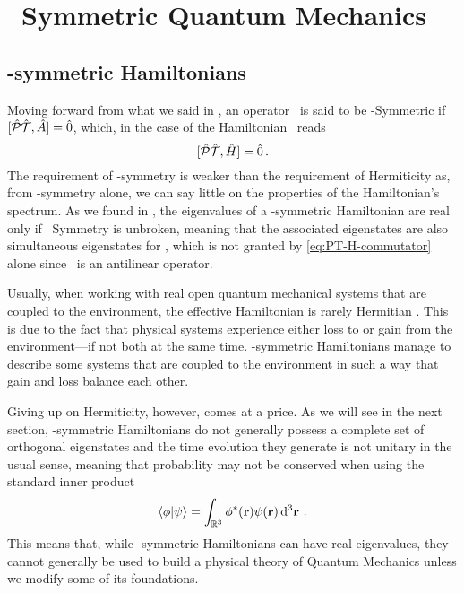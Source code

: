 \chapter{\PT\ Symmetric Quantum Mechanics}\label{ch:pt-symmetric-hamiltonians}
    \section{\PT-symmetric Hamiltonians}
        Moving forward from what we said in , an operator \hA\ is said to be \PT-Symmetric if $\comm*{\hPT}{\hA}\! = \hzero$, which, in the case of the Hamiltonian \hH\ reads
        \begin{equation}
            \label{eq:PT-H-commutator}
            \comm*{\hPT}{\hH}\! = \hzero
            \myperiod
        \end{equation}
        The requirement of \PT-symmetry is weaker than the requirement of Hermiticity as, from \PT-symmetry alone, we can say little on the properties of the Hamiltonian's spectrum. As we found in , the eigenvalues of a \PT-symmetric Hamiltonian are real only if \PT\ Symmetry is unbroken, meaning that the associated eigenstates are also simultaneous eigenstates for \hPT, which is not granted by \eqref{eq:PT-H-commutator} alone since \hPT\ is an antilinear operator.

        Usually, when working with real open quantum mechanical systems that are coupled to the environment, the effective Hamiltonian is rarely Hermitian \cite{bender2024}. This is due to the fact that physical systems experience either loss to or gain from the environment---if not both at the same time. \PT-symmetric  Hamiltonians manage to describe some systems that are coupled to the environment in such a way that gain and loss balance each other.

        Giving up on Hermiticity, however, comes at a price. As we will see in the next section, \PT-symmetric Hamiltonians do not generally possess a complete set of orthogonal eigenstates and the time evolution they generate is not unitary in the usual sense, meaning that probability may not be conserved when using the standard inner product
        \begin{equation}
            \label{eq:standard-inner-product}
            \braket{\phi}{\psi} = \int\nolimits_{\bbR^3} \phi^*\pqty{\vb{r}} \psi\pqty{\vb{r}} \dd[3]{\vb{r}}
            \myperiod
        \end{equation}
        This means that, while \PT-symmetric Hamiltonians can have real eigenvalues, they cannot generally be used to build a physical theory of Quantum Mechanics unless we modify some of its foundations.

